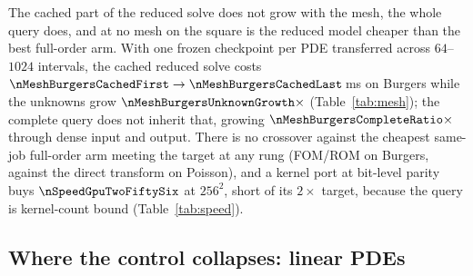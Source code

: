 The cached part of the reduced solve does not grow with the mesh, the whole
query does, and at no mesh on the square is the reduced model cheaper than
the best full-order arm. With one frozen checkpoint per PDE transferred across
$64$--$1024$ intervals, the cached reduced solve costs
$\nMeshBurgersCachedFirst\to\nMeshBurgersCachedLast$\,ms on Burgers while the
unknowns grow $\nMeshBurgersUnknownGrowth\times$ (Table~\ref{tab:mesh}); the
complete query does not inherit that, growing
$\nMeshBurgersCompleteRatio\times$ through dense input and output. There is no
crossover against the cheapest same-job full-order arm meeting the target at any
rung (FOM/ROM \nMeshBurgersFomOverRomRange{} on Burgers,
\nMeshPoissonFomOverRomRange{} against the direct transform on Poisson), and a
kernel port at bit-level parity buys $\nSpeedGpuTwoFiftySix$ at $256^2$, short
of its $2\times$ target, because the query is kernel-count bound
(Table~\ref{tab:speed}).

\subsection{Where the control collapses: linear PDEs}
\label{sec:exp:linear}

